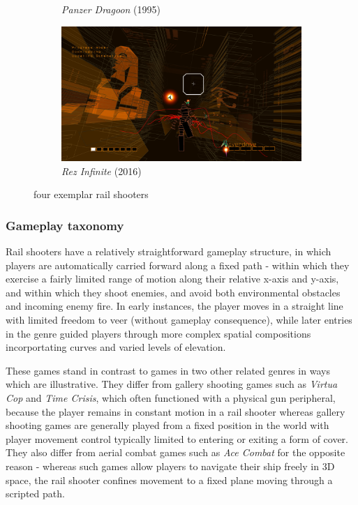 \documentclass[11pt]{article}
\begin{document}
\begin{figure}[h]
\begin{subfigure}{.5\textwidth}
  \caption{\textit{Panzer Dragoon} (1995)}
  \label{fig:sfig3}
\end{subfigure}
\begin{subfigure}{.5\textwidth}
  \centering
  \includegraphics[width=.8\linewidth]{rez}
  \caption{\textit{Rez Infinite} (2016)}
  \label{fig:sfig4}
\end{subfigure}
\caption{four exemplar rail shooters}
\label{fig:history}
\end{figure}

\subsubsection*{Gameplay taxonomy}

Rail shooters have a relatively straightforward gameplay structure, in which players are
automatically carried forward along a fixed path - within which they exercise a fairly
limited range of motion along their relative x-axis and y-axis, and within which they
shoot enemies, and avoid both environmental obstacles and incoming enemy fire. In early instances,
the player moves in a straight line with limited freedom to veer (without gameplay consequence),
while later entries in the genre guided players through more complex spatial compositions incorportating
curves and varied levels of elevation.

These games stand in contrast to games in two other related genres in ways which are illustrative.
They differ from gallery shooting games such as \textit{Virtua Cop} and \textit{Time Crisis}, which
often functioned with a physical gun peripheral, because the player remains in constant motion in
a rail shooter whereas gallery shooting games are generally played from a fixed position in the world
with player movement control typically limited to entering or exiting a form of cover. They also
differ from aerial combat games such as \textit{Ace Combat} for the opposite reason - whereas such
games allow players to navigate their ship freely in 3D space, the rail shooter confines movement to
a fixed plane moving through a scripted path.
\end{document}

